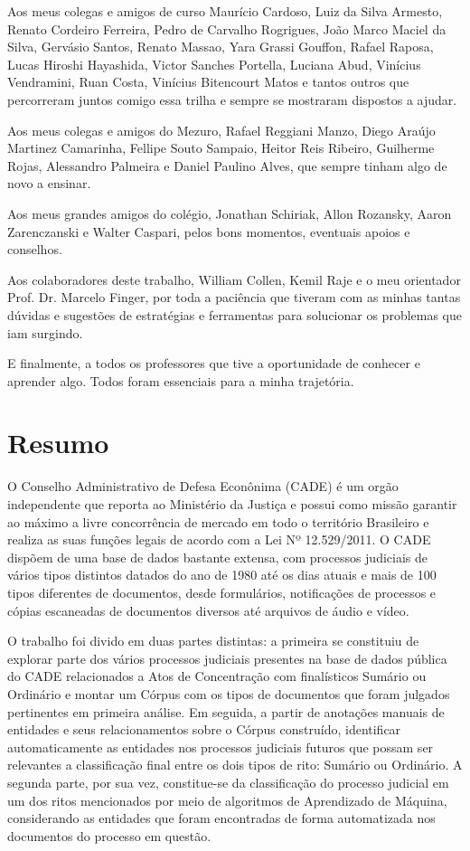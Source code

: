 \documentclass[11pt]{article}
\begin{document}
Aos meus colegas e amigos de curso Maurício Cardoso, Luiz da Silva Armesto, Renato Cordeiro Ferreira, Pedro de Carvalho Rogrigues, João Marco Maciel da Silva,
Gervásio Santos, Renato Massao, Yara Grassi Gouffon, Rafael Raposa, Lucas Hiroshi Hayashida, Victor Sanches Portella, Luciana Abud, Vinícius Vendramini, Ruan Costa,
Vinícius Bitencourt Matos e tantos outros que percorreram juntos comigo essa trilha e sempre se mostraram dispostos a ajudar.

Aos meus colegas e amigos do Mezuro, Rafael Reggiani Manzo, Diego Araújo Martinez Camarinha, Fellipe Souto Sampaio, Heitor Reis Ribeiro, Guilherme Rojas, Alessandro Palmeira e
Daniel Paulino Alves, que sempre tinham algo de novo a ensinar.

Aos meus grandes amigos do colégio, Jonathan Schiriak, Allon Rozansky, Aaron Zarenczanski e Walter Caspari, pelos bons momentos, eventuais apoios e conselhos.

Aos colaboradores deste trabalho, William Collen, Kemil Raje e o meu orientador Prof. Dr. Marcelo Finger, por toda a paciência que tiveram com as minhas tantas dúvidas e
sugestões de estratégias e ferramentas para solucionar os problemas que iam surgindo.

E finalmente, a todos os professores que tive a oportunidade de conhecer e aprender algo. Todos foram essenciais para a minha trajetória.

\pagebreak
\thispagestyle{empty}
\section*{Resumo}

\indent\indent O Conselho Administrativo de Defesa Econônima (CADE) é um orgão independente que reporta ao Ministério da Justiça e possui como missão garantir ao máximo a livre
concorrência de mercado em todo o território Brasileiro e realiza as suas funções legais de acordo com a Lei Nº 12.529/2011. O CADE dispõem de uma base de dados bastante extensa,
com processos judiciais de vários tipos distintos datados do ano de 1980 até os dias atuais e mais de 100 tipos diferentes de documentos, desde formulários, notificações de processos
e cópias escaneadas de documentos diversos até arquivos de áudio e vídeo.

O trabalho foi divido em duas partes distintas: a primeira se constituiu de explorar parte dos vários processos judiciais presentes na base de dados pública do CADE relacionados a Atos de
Concentração com finalísticos Sumário ou Ordinário e montar um Córpus com os tipos de documentos que foram julgados pertinentes em primeira análise. Em seguida, a partir de anotações
manuais de entidades e seus relacionamentos sobre o Córpus construído, identificar automaticamente as entidades nos processos judiciais futuros que possam ser relevantes a classificação
final entre os dois tipos de rito: Sumário ou Ordinário. A segunda parte, por sua vez, constitue-se da classificação do processo judicial em um dos ritos mencionados por meio de
algoritmos de Aprendizado de Máquina, considerando as entidades que foram encontradas de forma automatizada nos documentos do processo em questão.
\end{document}
